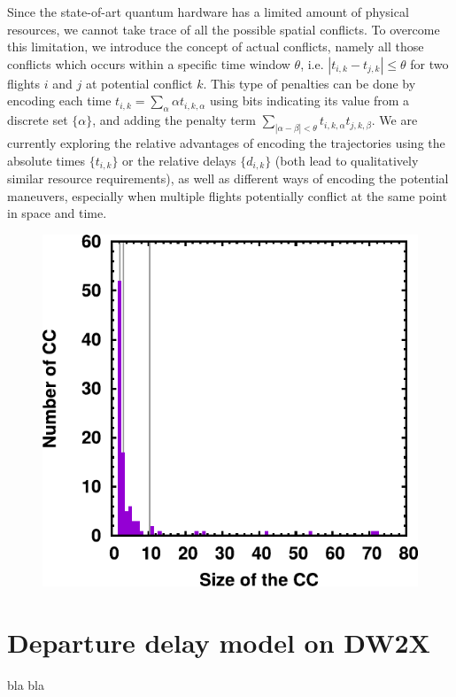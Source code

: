 Since the state-of-art quantum hardware has a limited amount of physical resources, we cannot take trace of all the possible
spatial conflicts. To overcome this limitation, we introduce the concept of actual conflicts, namely all those conflicts which occurs
within a specific time window $\theta$, i.e. $|t_{i,k} - t_{j,k}| \leq \theta$ for two flights $i$ and $j$ at potential conflict $k$.
This type of penalties can be done by encoding each time $t_{i,k} = \sum_{\alpha} \alpha t_{i,k,\alpha}$ using bits indicating its value from a discrete set $\{\alpha\}$, and adding the penalty term $\sum_{|\alpha - \beta| < \theta} t_{i,k,\alpha} t_{j,k,\beta}$.
We are currently exploring the relative advantages of encoding the trajectories using the absolute times $\{t_{i,k}\}$ or the relative delays $\{d_{i,k}\}$ (both lead to qualitatively similar resource requirements), as well as different ways of encoding the potential maneuvers, especially when multiple flights potentially conflict at the same point in space and time.

\begin{figure}
\includegraphics[scale=0.9]{images/cc_hist_mindist030_mintime060.pdf}
\end{figure}


\section*{Departure delay model on DW2X}

bla bla